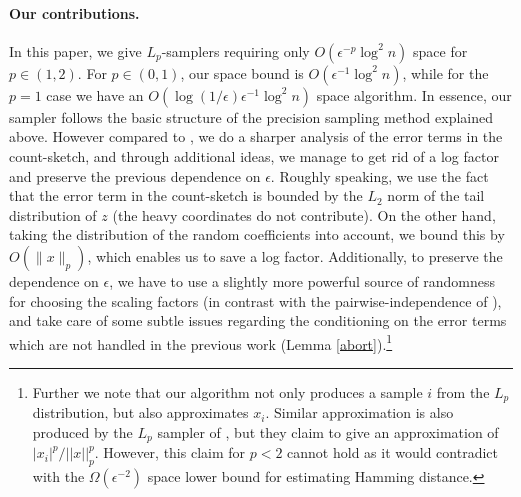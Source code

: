 \documentclass[9pt,letterpaper]{article}
\theoremstyle{remark}
\begin{document}
   \paragraph{Our contributions.} In %
   this paper,  we  give $L_p$-samplers requiring only
$O(\epsilon^{-p}\log^2n)$ space for $p \in (1,2)$. For $p \in (0,1)$,
our space bound is  $O(\epsilon^{-1}\log^2n)$, while for the $p=1$ case we have
an $O(\log(1/\epsilon)\epsilon^{-1}\log^2n)$ space algorithm.
    In essence, our sampler follows the basic structure of the
     precision sampling method explained above. %
      However compared to \cite{AndoniKO10}, we
      do a sharper analysis of the error terms in the count-sketch, and through
    additional ideas, we manage to get rid of a log factor
      and preserve the previous dependence on $\epsilon$. 
      Roughly speaking, we use the fact that 
      the error term in the count-sketch is bounded by the $L_2$ 
      norm of the tail distribution of $z$ (the heavy coordinates do not contribute). On
      the other hand, taking 
     the distribution of the random coefficients into account, we
     bound this by $O(\|x\|_p)$, which enables us to save a 
     log factor. Additionally, to preserve
      the dependence on $\epsilon$, we have to use a slightly more 
     powerful source of randomness for choosing the scaling factors
     (in contrast with the pairwise-independence of \cite{AndoniKO10}), and 
     take care of some subtle issues regarding the conditioning on
       the error terms which are not handled in the previous work 
       (Lemma \ref{abort}).\footnote{       
       Further we note that our
algorithm not only produces a sample $i$ from the $L_p$ distribution,
but also approximates $x_i$. Similar approximation is also produced by
the $L_p$ sampler of \cite{AndoniKO10}, but they
claim to give an approximation of $|x_i|^p/||x||_p^p$.
However, this claim for $p<2$ cannot hold as it would contradict
with the $\Omega(\epsilon^{-2})$ space lower bound for estimating 
Hamming distance.}
  
     
\end{document}

